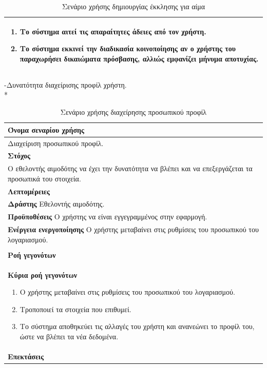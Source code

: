 \begin{table}[H]
\begin{center}
\begin{tabular}{|p{\dimexpr \linewidth-2\tabcolsep}|}
\begin{enumerate}
			\item Το σύστημα αιτεί τις απαραίτητες άδειες από τον χρήστη.
			\item Το σύστημα εκκινεί την διαδικασία κοινοποίησης αν ο χρήστης του παραχωρήσει δικαιώματα πρόσβασης, αλλιώς εμφανίζει μήνυμα αποτυχίας.
		\end{enumerate}
		\\ \hline
	    \end{tabular}
	    \caption{Σενάριο χρήσης δημιουργίας έκκλησης για αίμα}
	    \label{tab:create_blood_donor_request} 
	\end{center}
\end{table}

-Δυνατότητα διαχείρισης προφίλ χρήστη.
\\*
\begin{table}[H]
	\begin{center}
	    \begin{tabular}{|p{\dimexpr \linewidth-2\tabcolsep}|}
	    \hline
	    \rowcolor{grayy}
	    \textbf{Όνομα σεναρίου χρήσης}
	    \\ \hline    
	    Διαχείριση προσωπικού προφίλ. 
	     \\ \hline
	    \rowcolor{grayy}
	    \textbf{\textbf{Στόχος}}
	    \\ \hline
	 	 Ο εθελοντής αιμοδότης να έχει την δυνατότητα να βλέπει και να επεξεργάζεται τα προσωπικά του στοιχεία.
	    \\ \hline
	    \rowcolor{grayy}
	    \textbf{Λεπτομέρειες}
	    \\ \hline
		\textbf{Δράστης} Εθελοντής αιμοδότης.
		\\*
		\textbf{Προϋποθέσεις} Ο χρήστης να είναι εγγεγραμμένος στην εφαρμογή.
		\\*
		\textbf{Ενέργεια ενεργοποίησης} Ο χρήστης μεταβαίνει στις ρυθμίσεις του προσωπικού του λογαριασμού.
		\\ \hline
	    \\ \hline
		\rowcolor{grayy}    
	    \textbf{Ροή γεγονότων}
	    \\* 
		\textbf{Κύρια ροή γεγονότων}
		\begin{enumerate}
			\item	 Ο χρήστης μεταβαίνει στις ρυθμίσεις του προσωπικού του λογαριασμού.
			\item Τροποποιεί τα στοιχεία που επιθυμεί.
			\item Το σύστημα αποθηκεύει τις αλλαγές του χρήστη και ανανεώνει το προφίλ του, ώστε να βλέπει τα νέα δεδομένα.
		\end{enumerate}
		\\*
		\textbf{Επεκτάσεις}
		   \\ \hline
	    \end{tabular}
	    \caption{Σενάριο χρήσης διαχείρησης προσωπικού προφίλ}
	    \label{tab:profile_management}
	\end{center}
\end{table}	








